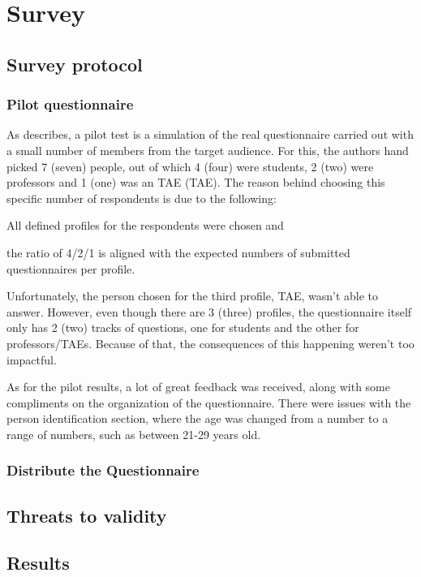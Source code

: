 
\chapter{Survey}\label{survey}

\section{Survey protocol}\label{sec:sv-p}

\subsection{Pilot questionnaire}\label{sec:sv-p:pilot}

As  describes, a pilot test is a simulation of the real questionnaire carried out with a small number of members from the target audience. For this, the authors hand picked 7 (seven) people, out of which 4 (four) were students, 2 (two) were professors and 1 (one) was an \acl{TAE} (\ac{TAE}). The reason behind choosing this specific number of respondents is due to the following:
\begin{inparaenum}[(i)]
  \item All defined profiles for the respondents were chosen and
  \item the ratio of 4/2/1 is aligned with the expected numbers of submitted questionnaires per profile.
\end{inparaenum}

Unfortunately, the person chosen for the third profile, \ac{TAE}, wasn't able to answer. However, even though there are 3 (three) profiles, the questionnaire itself only has 2 (two) tracks of questions, one for students and the other for professors/\acp{TAE}. Because of that, the consequences of this happening weren't too impactful.

As for the pilot results, a lot of great feedback was received, along with some compliments on the organization of the questionnaire. There were issues with the person identification section, where the age was changed from a number to a range of numbers, such as between 21-29 years old.

\subsection{Distribute the Questionnaire}\label{sec:survey-distribute}

\section{Threats to validity}\label{sec:sv-validity}


\section{Results}\label{sec:sv-results}